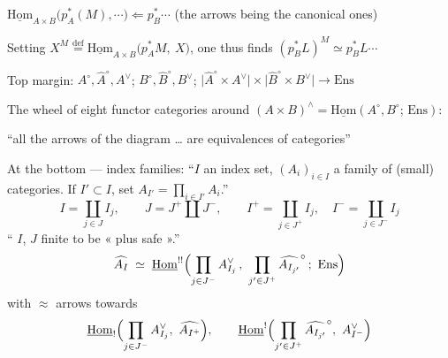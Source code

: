 \documentclass[11pt,a4paper]{article}
\begin{document}
$\underline{\mathrm{Hom}}_{A\times B}\bigl(p_{A}^{*}(M), \cdots\bigr)
\Leftarrow p_{B}^{*}\cdots$ (the arrows being the canonical ones)

Setting $X^{M} \overset{\mathrm{def}}{=}
\underline{\mathrm{Hom}}_{A\times B}\bigl(p_{A}^{*}M,\ X\bigr)$, one thus
finds $(p_{B}^{*}L)^{M} \simeq p_{B}^{*}L\cdots$

Top margin: $A^{\circ}, \widehat{A}^{\circ}, A^{\vee}$;
$B^{\circ}, \widehat{B}^{\circ}, B^{\vee}$;
$\bigl|\widehat{A}^{\circ} \times A^{\vee}\bigr| \times
 \bigl|\widehat{B}^{\circ} \times B^{\vee}\bigr| \to \mathrm{Ens}$

The wheel of eight functor categories around
$(A\times B)^{\wedge} = \underline{\mathrm{Hom}}(A^{\circ}, B^{\circ};\,
\mathrm{Ens})$:


``all the arrows of the diagram \ldots{} are equivalences of categories''

At the bottom — index families: ``$I$ an index set, $(A_i)_{i\in I}$ a
family of (small) categories. If $I' \subset I$, set
$A_{I'} = \prod_{i\in I'} A_i$.''
\[
I = \coprod_{j\in J} I_{j}, \qquad J = J^{+} \amalg J^{-},
\qquad I^{+} = \coprod_{j\in J^{+}} I_{j}, \quad
I^{-} = \coprod_{j\in J^{-}} I_{j}
\]
`` $I$, $J$ finite to be « plus safe ».''
\[
\widehat{A_{I}} \;\simeq\;
\underline{\mathrm{Hom}}^{!!}\Bigl(\prod_{j\in J^{-}} A_{I_{j}}^{\vee}\,,\
\prod_{j'\in J^{+}} \widehat{A_{I_{j'}}}^{\circ}\,;\ \mathrm{Ens}\Bigr)
\]
with $\approx$ arrows towards
\[
\underline{\mathrm{Hom}}_{!}\Bigl(\prod_{j\in J^{-}} A_{I_{j}}^{\vee},\
\widehat{A_{I^{+}}}\Bigr),
\qquad
\underline{\mathrm{Hom}}^{!}\Bigl(\prod_{j'\in J^{+}}
\widehat{A_{I_{j'}}}^{\circ},\ A_{I^{-}}^{\vee}\Bigr)
\]
\end{document}
